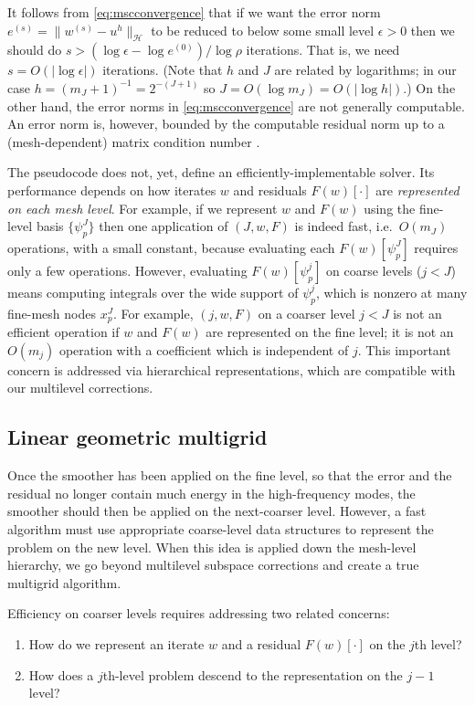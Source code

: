 \documentclass[letterpaper,final,12pt,reqno]{amsart}
\theoremstyle{claim}
\newcommand{\eps}{\epsilon}
\numberwithin{equation}{section}
\numberwithin{figure}{section}
\numberwithin{table}{section}
\numberwithin{theorem}{section}
\begin{document}
It follows from \eqref{eq:mscconvergence} that if we want the error norm $e^{(s)} = \|w^{(s)}-u^h\|_{\mathcal{H}}$ to be reduced to below some small level $\eps>0$ then we should do $s>(\log\eps - \log e^{(0)})/\log \rho$ iterations.  That is, we need $s=O(|\log\eps|)$ iterations.  (Note that $h$ and $J$ are related by logarithms; in our case $h=(m_J+1)^{-1}=2^{-(J+1)}$ so $J = O(\log m_J) = O(|\log h|)$.)  On the other hand, the error norms in \eqref{eq:mscconvergence} are not generally computable.  An error norm is, however, bounded by the computable residual norm up to a (mesh-dependent) matrix condition number \cite[Chapter 2]{Bueler2016}.

The pseudocode  does not, yet, define an efficiently-implementable solver.  Its performance depends on how iterates $w$ and residuals $F(w)[\cdot]$ are \emph{represented on each mesh level}.  For example, if we represent $w$ and $F(w)$ using the fine-level basis $\{\psi_p^J\}$ then one application of $(J,w,F)$ is indeed fast, i.e.~$O(m_J)$ operations, with a small constant, because evaluating each $F(w)[\psi_p^J]$ requires only a few operations.  However, evaluating $F(w)[\psi_p^j]$ on coarse levels ($j<J$) means computing integrals over the wide support of $\psi_p^j$, which is nonzero at many fine-mesh nodes $x_p^J$.  For example, $(j,w,F)$ on a coarser level $j<J$ is not an efficient operation if $w$ and $F(w)$ are represented on the fine level; it is not an $O(m_j)$ operation with a coefficient which is independent of $j$.  This important concern is addressed via hierarchical representations, which are compatible with our multilevel corrections.

\subsection*{Linear geometric multigrid}  Once the smoother has been applied on the fine level, so that the error and the residual no longer contain much energy in the high-frequency modes, the smoother should then be applied on the next-coarser level.  However, a fast algorithm must use appropriate coarse-level data structures to represent the problem on the new level.  When this idea is applied down the mesh-level hierarchy, we go beyond multilevel subspace corrections and create a true multigrid algorithm.

Efficiency on coarser levels requires addressing two related concerns:
\renewcommand{\labelenumi}{\emph{\roman{enumi})}}
\begin{enumerate}
\item How do we represent an iterate $w$ and a residual $F(w)[\cdot]$ on the $j$th level?
\item How does a $j$th-level problem descend to the representation on the $j-1$ level?
\end{enumerate}
\end{document}
